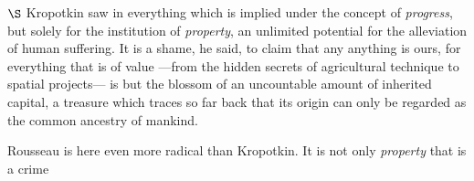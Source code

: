 \documentclass[a4paper]{article}
\begin{document}
$\S$ Kropotkin saw in everything which is implied under the concept of
\textit{progress}, but solely for the institution of \textit{property}, an
unlimited potential for the alleviation of human suffering. It is a shame, he
said, to claim that any anything is ours, for everything that is of value
---from the hidden secrets of agricultural technique to spatial projects--- is
but the blossom of an uncountable amount of inherited capital, a treasure which
traces so far back that its origin can only be regarded as the common ancestry
of mankind.

Rousseau is here even more radical than Kropotkin. It is not only
\textit{property} that is a crime
\end{document}
